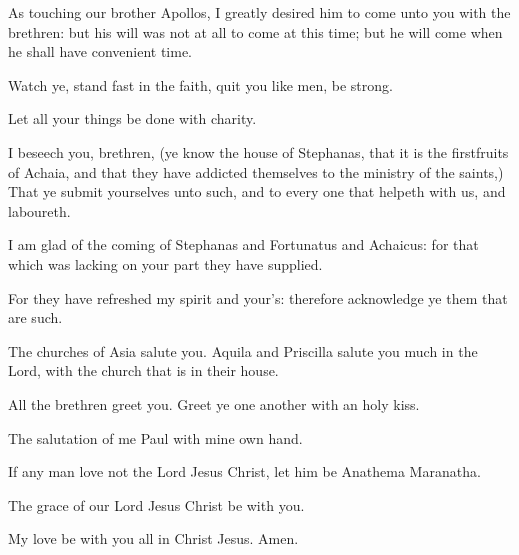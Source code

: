 \verse As touching our brother Apollos, I greatly desired him to come unto you with the brethren: but his will was not at all to come at this time; but he will come when he shall have convenient time.

\verse Watch ye, stand fast in the faith, quit you like men, be strong.

\verse Let all your things be done with charity.

\verse I beseech you, brethren, (ye know the house of Stephanas, that it is the firstfruits of Achaia, and that they have addicted themselves to the ministry of the saints,) \verse That ye submit yourselves unto such, and to every one that helpeth with us, and laboureth.

\verse I am glad of the coming of Stephanas and Fortunatus and Achaicus: for that which was lacking on your part they have supplied.

\verse For they have refreshed my spirit and your's: therefore acknowledge ye them that are such.

\verse The churches of Asia salute you. Aquila and Priscilla salute you much in the Lord, with the church that is in their house.

\verse All the brethren greet you. Greet ye one another with an holy kiss.

\verse The salutation of me Paul with mine own hand.

\verse If any man love not the Lord Jesus Christ, let him be Anathema Maranatha.

\verse The grace of our Lord Jesus Christ be with you.

\verse My love be with you all in Christ Jesus. Amen.


